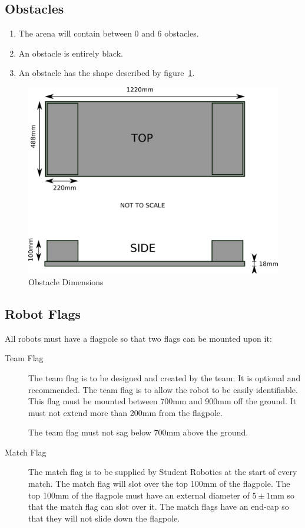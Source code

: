 \subsection{Obstacles}
\begin{enumerate}
\item The arena will contain between 0 and 6 obstacles.
\item An obstacle is entirely black.
\item An obstacle has the shape described by figure~\ref{fig:obstacle}.
\end{enumerate}

\begin{figure}
\begin{center}
\includegraphics[keepaspectratio, scale =1]{./images/obstacle.png}
\caption{\label{fig:obstacle}Obstacle Dimensions}
\end{center}
\end{figure}

\subsection{Robot Flags}
\label{sec:flags}
All robots must have a flagpole so that two flags can be mounted upon it:
\begin{description}
\item[Team Flag] The team flag is to be designed and created by the team.  It is optional and recommended.  The team flag is to allow the robot to be easily identifiable.  This flag must be mounted between 700mm and 900mm off the ground.  It must not extend more than 200mm from the flagpole.

The team flag must not sag below 700mm above the ground.
\item[Match Flag] The match flag is to be supplied by Student Robotics at the start of every match.  The match flag will slot over the top 100mm of the flagpole.  The top 100mm of the flagpole must have an external diameter of $5\pm1$mm so that the match flag can slot over it.  The match flags have an end-cap so that they will not slide down the flagpole.
\end{description}

